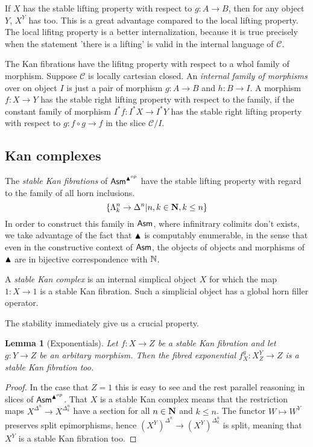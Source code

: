 \documentclass{amsart}
\theoremstyle{plain}
\newtheorem{lemma}[theorem]{Lemma}
\theoremstyle{definition}
\newcommand\hide[1]{}
\newcommand\cat\mathcal
\newcommand\set[1]{\left\{#1\right\}}
\begin{document}
If $X$ has the stable lifting property with respect to $g:A\to B$, then for any object $Y$, $X^Y$ has too. This is a great advantage compared to the local lifting property. The local lifitng property is a better internalization, because it is true precisely when the statement 'there is a lifting' is valid in the internal language of $\cat C$.

The Kan fibrations have the lifitng property with respect to a whol family of morphism. Suppose $\cat C$ is locally cartesian closed. An \emph{internal family of morphisms} over on object $I$ is just a pair of morphism $g:A\to B$ and $h:B\to I$. A morphism $f:X\to Y$ has the stable right lifting property with respect to the family, if the constant family of morphism $I^* f:I^* X\to I^* Y$ has the stable right lifting property with respect to $g:f\circ g\to f$ in the slice $\cat C/I$. %

\subsection{Kan complexes}
The \emph{stable Kan fibrations} of $\mathsf{Asm}^{\blacktriangle^{op}}$ have the stable lifting property with regard to the family of all horn inclusions.
\[ \set{\Lambda^n_k \to \Delta^n|n,k\in \nno, k\leq n} \]
In order to construct this family in $\mathsf{Asm}$, where infinitrary colimits don't exists, we take advantage of the fact that $\blacktriangle$ is computably enumerable, in the sense that even in the constructive context of $\mathsf{Asm}$, the objects of objects and morphisms of $\blacktriangle$ are in bijective correspondence with $\mathbb N$.
\hide{gaan we dit nog uitwerken?}

A \emph{stable Kan complex} is an internal simplical object $X$ for which the map $1:X\to 1$ is a stable Kan fibration. Such a simplicial object has a global horn filler operator.

The stability immediately give us a crucial property.

\begin{lemma}[Exponentials] Let $f:X\to Z$ be a stable Kan fibration and let $g:Y\to Z$ be an arbitary morphism. Then the fibred exponential $f^g_X:X^Y_Z\to Z$ is a stable Kan fibration too. \label{exp}\end{lemma}

\begin{proof} In the case that $Z=1$ this is easy to see and the rest parallel reasoning in slices of $\mathsf{Asm}^{\blacktriangle^{op}}$. That $X$ is a stable Kan complex means that the restriction maps $X^{\Delta^n} \to X^{\Delta^n_k}$ have a section for all $n\in \mathbf{N}$ and $k\leq n$. The functor $W\mapsto W^Y$ preserves split epimorphisms, hence $(X^Y)^{\Delta^n} \to (X^Y)^{\Delta^n_k}$ is split, meaning that $X^Y$ is a stable Kan fibration too.
\end{proof}
\end{document}
